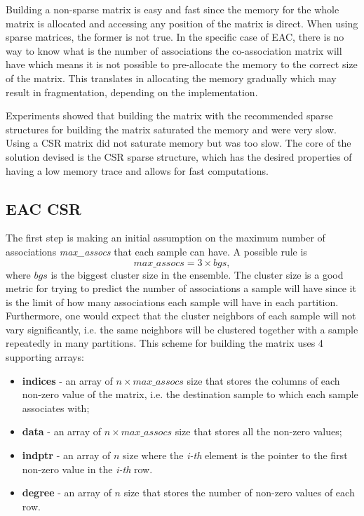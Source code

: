 Building a non-sparse matrix is easy and fast since the memory for the whole matrix is allocated and accessing any position of the matrix is direct.
When using sparse matrices, the former is not true.
In the specific case of EAC, there is no way to know what is the number of associations the co-association matrix will have which means it is not possible to pre-allocate the memory to the correct size of the matrix.
This translates in allocating the memory gradually which may result in fragmentation, depending on the implementation. 


Experiments showed that building the matrix with the recommended sparse structures for building the matrix saturated the memory and were very slow.
Using a CSR matrix did not saturate memory but was too slow. %
The core of the solution devised is the CSR sparse structure, which has the desired properties of having a low memory trace and allows for fast computations.

\subsection{EAC CSR}

The first step is making an initial assumption on the maximum number of associations \emph{max\_assocs} that each sample can have.
A possible rule is $$max\_assocs = 3 \times bgs , $$ where $bgs$ is the biggest cluster size in the ensemble.
The cluster size is a good metric for trying to predict the number of associations a sample will have since it is the limit of how many associations each sample will have in each partition.
Furthermore, one would expect that the cluster neighbors of each sample will not vary significantly, i.e. the same neighbors will be clustered together with a sample repeatedly in many partitions.
This scheme for building the matrix uses 4 supporting arrays:

\begin{itemize}
	\item \textbf{indices} - an array of $n \times max\_assocs$ size that stores the columns of each non-zero value of the matrix, i.e. the destination sample to which each sample associates with;
	\item \textbf{data} - an array of $n \times max\_assocs$ size that stores all the non-zero values;
	\item \textbf{indptr} - an array of $n$ size where the \emph{i-th} element is the pointer to the first non-zero value in the \emph{i-th} row.
	\item \textbf{degree} - an array of $n$ size that stores the number of non-zero values of each row.
\end{itemize}

